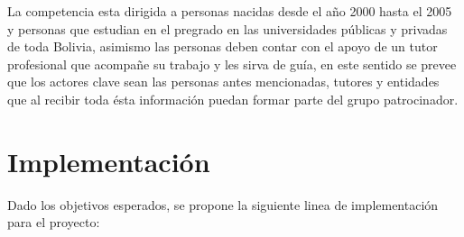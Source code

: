 \documentclass{article}
\begin{document}
La competencia esta dirigida a personas nacidas desde el año 2000 hasta el 2005 y personas que estudian en el pregrado en las universidades públicas y privadas de toda Bolivia, asimismo las personas deben contar con el apoyo de un tutor profesional que acompañe su trabajo y les sirva de guía, en este sentido se prevee que los actores clave sean las personas antes mencionadas, tutores y entidades que al recibir toda ésta información puedan formar parte del grupo patrocinador.

\section{Implementación}

Dado los objetivos esperados, se propone la siguiente linea de implementación para el proyecto:
\end{document}
